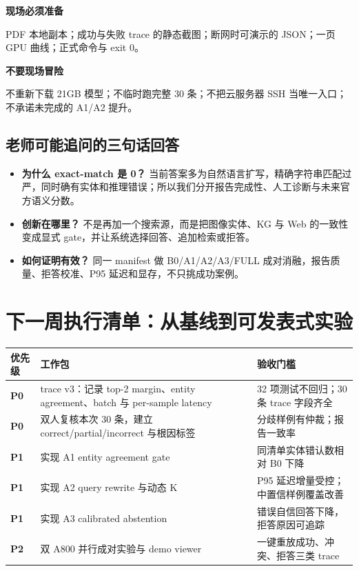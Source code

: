 \documentclass[11pt,a4paper]{ctexart}
\begin{document}
\begin{minipage}[t]{0.48\textwidth}
\begin{greenbox}
\textbf{现场必须准备}\par
PDF 本地副本；成功与失败 trace 的静态截图；断网时可演示的 JSON；一页 GPU 曲线；正式命令与 exit 0。
\end{greenbox}
\end{minipage}
\hfill
\begin{minipage}[t]{0.48\textwidth}
\begin{riskbox}
\textbf{不要现场冒险}\par
不重新下载 21GB 模型；不临时跑完整 30 条；不把云服务器 SSH 当唯一入口；不承诺未完成的 A1/A2 提升。
\end{riskbox}
\end{minipage}

\subsection{老师可能追问的三句话回答}
\begin{itemize}
  \item \textbf{为什么 exact-match 是 0？} 当前答案多为自然语言扩写，精确字符串匹配过严，同时确有实体和推理错误；所以我们分开报告完成性、人工诊断与未来官方语义分数。
  \item \textbf{创新在哪里？} 不是再加一个搜索源，而是把图像实体、KG 与 Web 的一致性变成显式 gate，并让系统选择回答、追加检索或拒答。
  \item \textbf{如何证明有效？} 同一 manifest 做 B0/A1/A2/A3/FULL 成对消融，报告质量、拒答校准、P95 延迟和显存，不只挑成功案例。
\end{itemize}
\clearpage

\section{下一周执行清单：从基线到可发表式实验}

\begin{tabularx}{\textwidth}{>{\bfseries}p{18mm} p{50mm} X}
\toprule
优先级 & 工作包 & 验收门槛 \\
\midrule
P0 & trace v3：记录 top-2 margin、entity agreement、batch 与 per-sample latency & 32 项测试不回归；30 条 trace 字段齐全 \\
P0 & 双人复核本次 30 条，建立 correct/partial/incorrect 与根因标签 & 分歧样例有仲裁；报告一致率 \\
P1 & 实现 A1 entity agreement gate & 同清单实体错认数相对 B0 下降 \\
P1 & 实现 A2 query rewrite 与动态 K & P95 延迟增量受控；中置信样例覆盖改善 \\
P1 & 实现 A3 calibrated abstention & 错误自信回答下降，拒答原因可追踪 \\
P2 & 双 A800 并行成对实验与 demo viewer & 一键重放成功、冲突、拒答三类 trace \\
\bottomrule
\end{tabularx}
\end{document}
